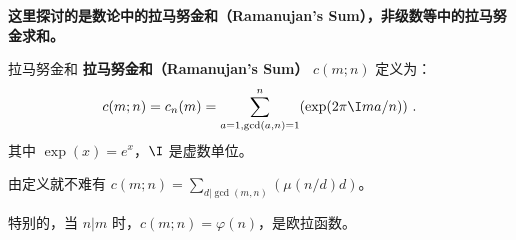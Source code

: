 

\textbf{这里探讨的是数论中的拉马努金和（Ramanujan's Sum），非级数等中的拉马努金求和。}

\begin{definition}{拉马努金和}
\textbf{拉马努金和（Ramanujan's Sum）} $c(m; n)$ 定义为：
\begin{equation}
c(m; n) = c_n(m) = \sum_{a=1, \gcd(a, n) = 1}^n (\exp(2\pi \I m a / n)) ~.
\end{equation}
其中 $\exp(x) = e^x$，$\I$ 是虚数单位。
\end{definition}

由定义就不难有 $c(m; n) = \sum_{d | \gcd(m, n)} (\mu(n/d) d)$。

特别的，当 $n | m$ 时，$c(m; n) = \varphi(n)$，是欧拉函数。